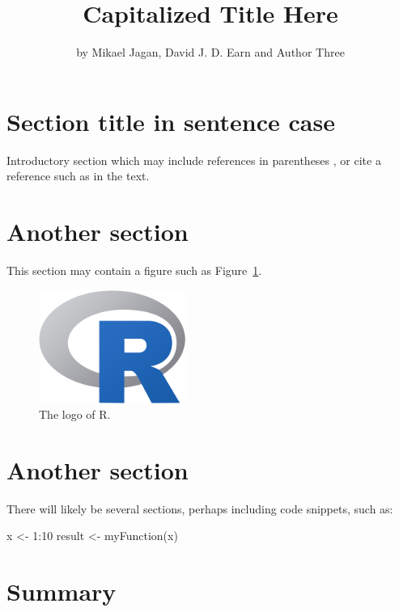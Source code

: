 \title{Capitalized Title Here}
\author{by Mikael Jagan, David J. D. Earn and Author Three}

\maketitle


\section{Section title in sentence case}

Introductory section which may include references in parentheses
\citep{R}, or cite a reference such as \citet{R} in the text.

\section{Another section}

This section may contain a figure such as Figure~\ref{figure:rlogo}.

\begin{figure}[htbp]
  \centering
  \includegraphics{Rlogo-5}
  \caption{The logo of R.}
  \label{figure:rlogo}
\end{figure}

\section{Another section}

There will likely be several sections, perhaps including code snippets, such as:

\begin{example}
  x <- 1:10
  result <- myFunction(x)
\end{example}

\section{Summary}

